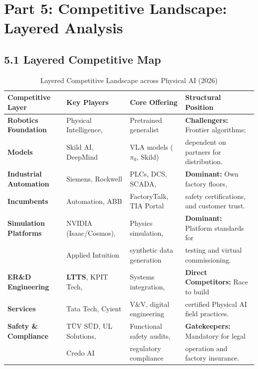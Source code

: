 \documentclass[11pt,a4paper]{article}
\begin{document}
\section{Part 5: Competitive Landscape: Layered Analysis}

\subsection{5.1 Layered Competitive Map}
\begin{table}[h!]
\centering
\small
\begin{tabularx}{\textwidth}{@{}l p{3.8cm} p{3.2cm} X@{}}
\toprule
\textbf{Competitive Layer} & \textbf{Key Players} & \textbf{Core Offering} & \textbf{Structural Position} \\
\midrule
\textbf{Robotics Foundation} & Physical Intelligence, & Pretrained generalist & \textbf{Challengers:} Frontier algorithms; \\
\textbf{Models} & Skild AI, DeepMind & VLA models ($\pi_0$, Skild) & dependent on partners for distribution. \\
\addlinespace
\textbf{Industrial Automation} & Siemens, Rockwell & PLCs, DCS, SCADA, & \textbf{Dominant:} Own factory floors, \\
\textbf{Incumbents} & Automation, ABB & FactoryTalk, TIA Portal & safety certifications, and customer trust. \\
\addlinespace
\textbf{Simulation Platforms} & NVIDIA (Isaac/Cosmos), & Physics simulation, & \textbf{Dominant:} Platform standards for \\
& Applied Intuition & synthetic data generation & testing and virtual commissioning. \\
\addlinespace
\textbf{ER\&D Engineering} & \textbf{LTTS}, KPIT Tech, & Systems integration, & \textbf{Direct Competitors:} Race to build \\
\textbf{Services} & Tata Tech, Cyient & V\&V, digital engineering & certified Physical AI field practices. \\
\addlinespace
\textbf{Safety \& Compliance} & TÜV SÜD, UL Solutions, & Functional safety audits, & \textbf{Gatekeepers:} Mandatory for legal \\
& Credo AI & regulatory compliance & operation and factory insurance. \\
\bottomrule
\end{tabularx}
\caption{Layered Competitive Landscape across Physical AI (2026)}
\end{table}
\end{document}
